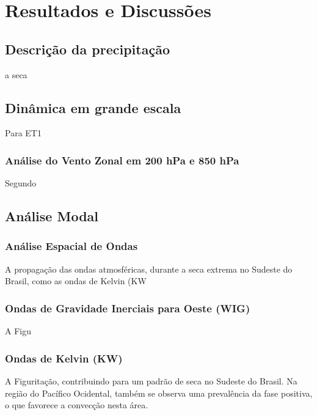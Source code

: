 \chapter{Resultados e Discussões}\label{cap:resultados}

\section{Descrição da precipitação}

a seca

\section{Dinâmica em grande escala}

Para ET1 

\subsection{Análise do Vento Zonal em 200 hPa e 850 hPa}

Segundo  

\section{Análise Modal}

\subsection{Análise Espacial de Ondas}

A propagação das ondas atmosféricas, durante a seca extrema no Sudeste do Brasil, como as ondas de Kelvin (KW

\subsection{Ondas de Gravidade Inerciais para Oeste (WIG)}

A Figu

\subsection{Ondas de Kelvin (KW)}

A Figuritação, contribuindo para um padrão de seca no Sudeste do Brasil. Na região do Pacífico Ocidental, também se observa uma prevalência da fase positiva, o que favorece a convecção nesta área.
